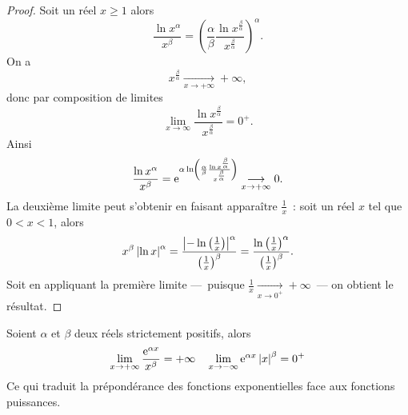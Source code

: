 \begin{proof} 
  Soit un réel $x \geq 1$ alors 
  \begin{equation} 
    \frac{\ln x^\alpha}{x^\beta}=\left(\frac{\alpha}{\beta} \frac{\ln x^{\frac{\beta}{\alpha}}}{x^{\frac{\beta}{\alpha}}} \right)^\alpha.
  \end{equation}
  On a 
  \begin{equation}
    x^{\frac{\beta}{\alpha}}\underset{x \to +\infty}{\longrightarrow}+\infty,
  \end{equation} 
  donc par composition de limites 
  \begin{equation}
    \lim\limits_{x \to \infty} \frac{\ln x^{\frac{\beta}{\alpha}}}{x^{\frac{\beta}{\alpha}}}=0^{+}.
  \end{equation}
  Ainsi
  \begin{equation}
    \frac{\ln x ^\alpha}{x^\beta}=\operatorname{e}^{\alpha \ln \left(\frac{\alpha}{\beta} \frac{\ln x^{\frac{\beta}{\alpha}}}{x^{\frac{\beta}{\alpha}}} \right)} \underset{x \to +\infty}{\longrightarrow}0.
  \end{equation}
  La deuxième limite peut s'obtenir en faisant apparaître $\frac{1}{x}$~: soit un réel $x$ tel que $0<x<1$, alors
  \begin{equation}
    x^\beta \left\lvert\ln x\right\rvert^\alpha=\frac{\left\lvert-\ln\left(\frac{1}{x}\right)\right\rvert^\alpha}{\left(\frac{1}{x} \right)^\beta}=\frac{\ln\left(\frac{1}{x}\right)^\alpha}{\left(\frac{1}{x}\right)^\beta}.
  \end{equation}
  Soit en appliquant la première limite ---~puisque $\frac{1}{x}\underset{x \to 0^+}{\longrightarrow}+\infty$~--- on obtient le résultat.
\end{proof}
%
\begin{prop} 
  Soient $\alpha$ et $\beta$ deux réels strictement positifs, alors 
  \begin{equation} 
    \lim\limits_{x \to + \infty} \frac{\operatorname{e}^{\alpha x}}{x^\beta}=+\infty \quad \lim\limits_{x \to -\infty} \operatorname{e}^{\alpha x} \left\lvert x\right\rvert^\beta=0^+
  \end{equation}
  Ce qui traduit la prépondérance des fonctions exponentielles face aux fonctions puissances.
\end{prop}
%
